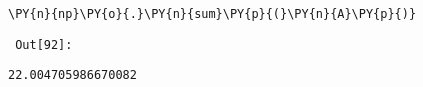 {\par%
\vspace{-1\baselineskip}%
}%
\begin{notebookcell}[92]%
\begin{addmargin}[\cellleftmargin]{0em}%
{\smaller%
\par%
%
\vspace{-1\smallerfontscale}%
\begin{Verbatim}[commandchars=\\\{\}]
\PY{n}{np}\PY{o}{.}\PY{n}{sum}\PY{p}{(}\PY{n}{A}\PY{p}{)}
\end{Verbatim}
%
\par%
\vspace{-1\smallerfontscale}}%
\end{addmargin}
\end{notebookcell}

\par\vspace{1\smallerfontscale}%
    
        {\par%
        \vspace{-1\smallerfontscale}%
        \noindent%
        \begin{minipage}{\cellleftmargin}%
    \hfill%
    {\smaller%
    \tt%
    \color{nbframe-out-prompt}%
    Out[92]:}%
    \hspace{\inputpadding}%
    \hspace{0em}%
    \hspace{3pt}%
    \end{minipage}%
        }%
    \begin{addmargin}[\cellleftmargin]{0em}%
    {\smaller%
    \vspace{-1\smallerfontscale}%
    
    
    
    \begin{verbatim}
22.004705986670082
    \end{verbatim}

    
}%
    \end{addmargin}%

